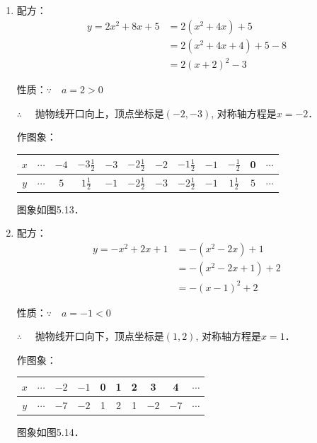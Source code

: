 \begin{solution}
\begin{enumerate}
    \item 配方：
\[\begin{split}
    y=2x^2+8x+5&=2(x^2+4x)+5\\
    &=2(x^2+4x+4)+5-8\\
    &=2(x+2)^2-3
\end{split}\]

性质：$\because\quad a=2>0$

$\therefore\quad $
抛物线开口向上，顶点坐标是$(-2,-3)$, 对称轴方程是$x=-2$．

作图象：
\begin{center}
\begin{tabular}{c|ccccccccccc}
\hline
$x$&$\cdots$& $-4$ &  $-3\tfrac{1}{2}$ & $-3$ &  $-2\tfrac{1}{2}$ & $-2$ &  $-1\tfrac{1}{2}$ &  $-1$ &  $-\tfrac{1}{2}$ &  0 &$\cdots$\\
\hline
$y$&$\cdots$ & $5$& $1\tfrac{1}{2}$ &  $-1$ &  $-2\tfrac{1}{2}$ &  $-3$ &  $-2\tfrac{1}{2}$ &  $-1$ &  $1\tfrac{1}{2}$ &  $5$ &  $\cdots$ \\
\hline
\end{tabular}
\end{center}  
图象如图5.13．

\item 配方：
\[\begin{split}
    y=-x^2+2x+1&=-(x^2-2x)+1\\
    &=-(x^2-2x+1)+2\\
&=-(x-1)^2+2
\end{split}\]

性质：$\because\quad a=-1<0$

$\therefore\quad $
抛物线开口向下，顶点坐标是$(1,2)$, 对称轴方程是$x=1$．

作图象：
\begin{center}
\begin{tabular}{c|ccccccccc}
\hline
$x$&$\cdots$& $-2$ &  $-1$ & 0 & 1 & 2 &  3 &  4 &$\cdots$\\
\hline
$y$&$\cdots$ & $-7$& $-2$ &  1 & 2 & 1 &  $-2$ &  $-7$  &  $\cdots$ \\
\hline
\end{tabular}
\end{center}  
图象如图5.14．


\end{enumerate}
\end{solution}
